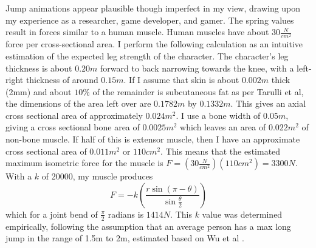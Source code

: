 Jump animations appear plausible though imperfect in my view, drawing upon my experience as a researcher, game developer, and gamer.  The spring values result in forces similar to a human muscle.  Human muscles have about $30\frac{N}{cm^2}$ force per cross-sectional area\cite{biomech_sport}. I perform the following calculation as an intuitive estimation of the expected leg strength of the character. The character's leg thickness is about $0.20m$ forward to back narrowing towards the knee, with a left-right thickness of around $0.15m$. If I assume that skin is about $0.002m$ thick (2mm) and about $10\%$ of the remainder is subcutaneous fat as per Tarulli et al\cite{fat_layer}, the dimensions of the area left over are $0.1782m$ by $0.1332m$.  This gives an axial cross sectional area of approximately $0.024m^2$.  I use a bone width of $0.05m$, giving a cross sectional bone area of $0.0025m^2$ which leaves an area of $0.022m^2$ of non-bone muscle.  If half of this is extensor muscle, then I have an approximate cross sectional area of $0.011m^2$ or $110cm^2$.  This means that the estimated maximum isometric force for the muscle is $F = \left(30 \frac{N}{cm^2}\right) \left(110cm^2\right) = 3300N$.  With a $k$ of 20000, my muscle produces \[
	F = -k \left(\dfrac{r \sin (\pi - \theta)}{\sin \frac{\theta}{2}} \right)
\]
which for a joint bend of $\frac{\pi}{2}$ radians is $1414N$.  This $k$ value was determined empirically, following the assumption that an average person has a max long jump in the range of 1.5m to 2m, estimated based on Wu et al \cite{longjump}.    

